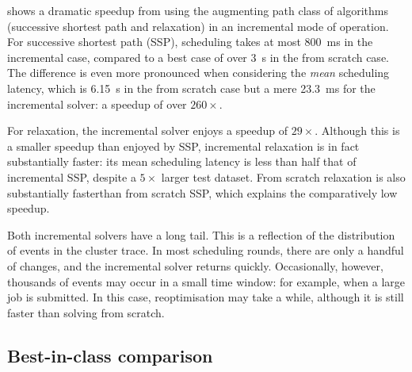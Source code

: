  shows a dramatic speedup from using the augmenting path class of algorithms (successive shortest path and relaxation) in an incremental mode of operation. For successive shortest path (SSP), scheduling takes at most \SI{800}{\milli\second} in the incremental case, compared to a best case of over \SI{3}{\second} in the from scratch case. The difference is even more pronounced when considering the \emph{mean} scheduling latency, which is \SI{6.15}{\second} in the from scratch case but a mere \SI{23.3}{\milli\second} for the incremental solver: a speedup of over $260\times$. 

For relaxation, the incremental solver enjoys a speedup of $29\times$. Although this is a smaller speedup than enjoyed by SSP, incremental relaxation is in fact substantially faster: its mean scheduling latency is less than half that of incremental SSP, despite a $5\times$ larger test dataset. From scratch relaxation is also substantially faster\footnotemark than from scratch SSP, which explains the comparatively low speedup.


Both incremental solvers have a long tail. This is a reflection of the distribution of events in the cluster trace. In most scheduling rounds, there are only a handful of changes, and the incremental solver returns quickly. Occasionally, however, thousands of events may occur in a small time window: for example, when a large job is submitted. In this case, reoptimisation may take a while, although it is still faster than solving from scratch.


\subsection{Best-in-class comparison}

